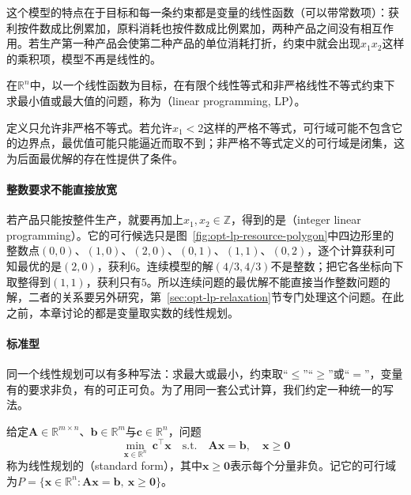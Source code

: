 这个模型的特点在于目标和每一条约束都是变量的线性函数（可以带常数项）：获利按件数成比例累加，原料消耗也按件数成比例累加，两种产品之间没有相互作用。若生产第一种产品会使第二种产品的单位消耗打折，约束中就会出现$x_1x_2$这样的乘积项，模型不再是线性的。

\begin{definition}[线性规划]
\label{def:opt-lp-linear-program}
在$\mathbb R^n$中，以一个线性函数为目标，在有限个线性等式和非严格线性不等式约束下求最小值或最大值的问题，称为（linear programming, LP）。
\end{definition}

定义只允许非严格不等式。若允许$x_1<2$这样的严格不等式，可行域可能不包含它的边界点，最优值可能只能逼近而取不到；非严格不等式定义的可行域是闭集，这为后面最优解的存在性提供了条件。

\paragraph{整数要求不能直接放宽}
若产品只能按整件生产，就要再加上$x_1,x_2\in\mathbb Z$，得到的是（integer linear programming）。它的可行候选只是图~\ref{fig:opt-lp-resource-polygon}中四边形里的整数点$(0,0)$、$(1,0)$、$(2,0)$、$(0,1)$、$(1,1)$、$(0,2)$，逐个计算获利可知最优的是$(2,0)$，获利$6$。连续模型的解$(4/3,4/3)$不是整数；把它各坐标向下取整得到$(1,1)$，获利只有$5$。所以连续问题的最优解不能直接当作整数问题的解，二者的关系要另外研究，第~\ref{sec:opt-lp-relaxation}节专门处理这个问题。在此之前，本章讨论的都是变量取实数的线性规划。

\paragraph{标准型}
同一个线性规划可以有多种写法：求最大或最小，约束取“$\le$”“$\ge$”或“$=$”，变量有的要求非负，有的可正可负。为了用同一套公式计算，我们约定一种统一的写法。

\begin{definition}[线性规划的标准型]
\label{def:opt-lp-standard-form}
给定$\bm A\in\mathbb R^{m\times n}$、$\bm b\in\mathbb R^m$与$\bm c\in\mathbb R^n$，问题
\begin{equation}
\label{eq:opt-lp-standard}
  \min_{\bm x\in\mathbb R^n}\ \bm c^\top\bm x
  \quad\text{s.t.}\quad
  \bm A\bm x=\bm b,\quad \bm x\ge\bm 0
\end{equation}
称为线性规划的（standard form），其中$\bm x\ge\bm 0$表示每个分量非负。记它的可行域为$P=\{\bm x\in\mathbb R^n:\bm A\bm x=\bm b,\ \bm x\ge\bm 0\}$。
\end{definition}


